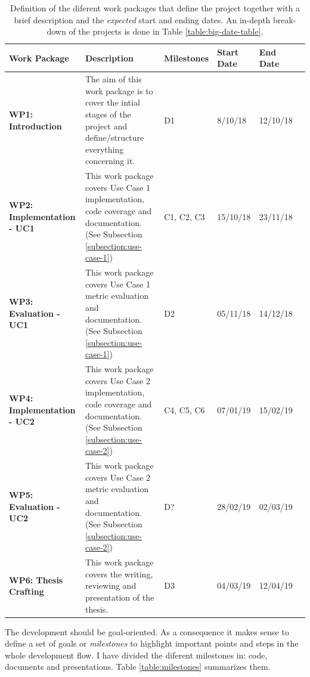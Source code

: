 \documentclass{article}
\begin{document}
\begin{table}[h!]
\centering
\begin{adjustbox}{max width=\linewidth}
\begin{tabular}{m{3cm}m{7cm}llll}
\hline
\textbf{Work Package} & \textbf{Description} & \textbf{Milestones} & \textbf{Start Date} & \textbf{End Date} \\[3pt] \hline \hline
\textbf{WP1: Introduction} & The aim of this work package is to cover the intial stages of the project and define/structure everything concerning it. & D1 & 8/10/18 & 12/10/18 \\[3pt] \hline
\textbf{WP2: Implementation - UC1} & This work package covers Use Case 1 implementation, code coverage and documentation. (See Subsection \ref{subsection:use-case-1}) & C1, C2, C3 & 15/10/18 & 23/11/18 \\[3pt] \hline
\textbf{WP3: Evaluation - UC1} & This work package covers Use Case 1 metric evaluation and documentation. (See Subsection \ref{subsection:use-case-1}) & D2 & 05/11/18 & 14/12/18 \\[3pt] \hline
\textbf{WP4: Implementation - UC2} & This work package covers Use Case 2 implementation, code coverage and documentation. (See Subsection \ref{subsection:use-case-2}) & C4, C5, C6 & 07/01/19 & 15/02/19 \\[3pt] \hline
\textbf{WP5: Evaluation - UC2} & This work package covers Use Case 2 metric evaluation and documentation. (See Subsection \ref{subsection:use-case-2}) & D? & 28/02/19 & 02/03/19 \\[3pt] \hline
\textbf{WP6: Thesis Crafting} & This work package covers the writing, reviewing and presentation of the thesis. & D3 & 04/03/19 & 12/04/19 \\[3pt] \hline
\end{tabular}
\end{adjustbox}
\caption{Definition of the diferent work packages that define the project together with a brief description and the \emph{expected} start and ending dates. An in-depth break-down of the projects is done in Table \ref{table:big-date-table}. \label{table:work-packages}}
\end{table}
The development should be goal-oriented. As a consequence it makes sense to define a set of goals or \emph{milestones} to highlight important points and steps in the whole development flow. I have divided the diferent milestones in: code, documents and presentations. Table \ref{table:milestones} summarizes them.
\end{document}
